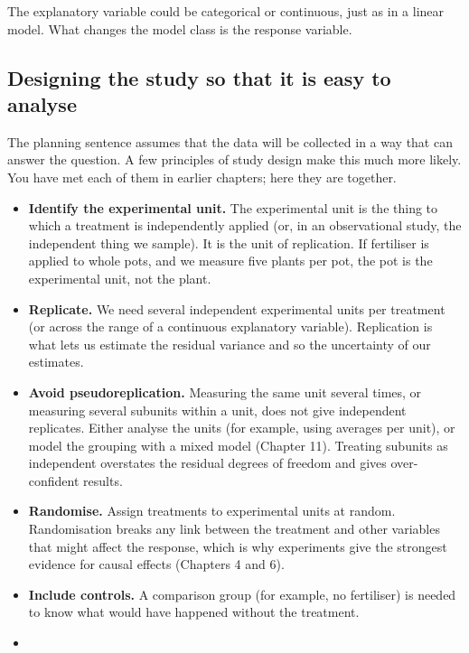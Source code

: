 \documentclass[
  letterpaper,
  8pt,
  a4paper]{book}
\providecommand{\tightlist}{%
  \setlength{\itemsep}{0pt}\setlength{\parskip}{0pt}}
\begin{document}
The explanatory variable could be categorical or continuous, just as in
a linear model. What changes the model class is the response variable.

\subsection*{Designing the study so that it is easy to
analyse}\label{designing-the-study-so-that-it-is-easy-to-analyse}

The planning sentence assumes that the data will be collected in a way
that can answer the question. A few principles of study design make this
much more likely. You have met each of them in earlier chapters; here
they are together.

\begin{itemize}
\tightlist
\item
  \textbf{Identify the experimental unit.} The experimental unit is the
  thing to which a treatment is independently applied (or, in an
  observational study, the independent thing we sample). It is the unit
  of replication. If fertiliser is applied to whole pots, and we measure
  five plants per pot, the pot is the experimental unit, not the plant.
\item
  \textbf{Replicate.} We need several independent experimental units per
  treatment (or across the range of a continuous explanatory variable).
  Replication is what lets us estimate the residual variance and so the
  uncertainty of our estimates.
\item
  \textbf{Avoid pseudoreplication.} Measuring the same unit several
  times, or measuring several subunits within a unit, does not give
  independent replicates. Either analyse the units (for example, using
  averages per unit), or model the grouping with a mixed model (Chapter
  11). Treating subunits as independent overstates the residual degrees
  of freedom and gives over-confident results.
\item
  \textbf{Randomise.} Assign treatments to experimental units at random.
  Randomisation breaks any link between the treatment and other
  variables that might affect the response, which is why experiments
  give the strongest evidence for causal effects (Chapters 4 and 6).
\item
  \textbf{Include controls.} A comparison group (for example, no
  fertiliser) is needed to know what would have happened without the
  treatment.
\item

\end{itemize}
\end{document}
